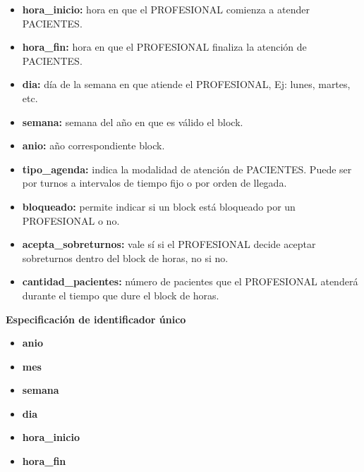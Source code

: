 \documentclass[a4paper,11pt]{article}
\begin{document}
\begin{itemize}


     \item \textbf{hora\_inicio:} hora en que el PROFESIONAL comienza a atender PACIENTES.

     \item \textbf{hora\_fin:} hora en que el PROFESIONAL finaliza la atención de PACIENTES.

     \item \textbf{dia:} día de la semana en que atiende el PROFESIONAL, Ej: lunes, martes, etc.

     \item \textbf{semana:} semana del año en que es válido el block.

	 \item \textbf{anio:} año correspondiente block.
	 
     \item \textbf{tipo\_agenda:} indica la modalidad de atención de PACIENTES. Puede ser por 
     turnos a intervalos de tiempo fijo o por orden de llegada.

     \item \textbf{bloqueado:} permite indicar si un block está bloqueado por un PROFESIONAL o no.

     \item \textbf{acepta\_sobreturnos:} vale sí si el PROFESIONAL decide aceptar sobreturnos dentro 
     del block de horas, no si no.

     \item \textbf{cantidad\_pacientes:} número de pacientes que el PROFESIONAL atenderá
     durante el tiempo que dure el block de horas.

\end{itemize}

\textbf{Especificación de identificador único}

\begin{itemize}

    \item \textbf{anio}

    \item \textbf{mes}

    \item \textbf{semana}

    \item \textbf{dia}

    \item \textbf{hora\_inicio}

    \item \textbf{hora\_fin}

\end{itemize}
\end{document}
